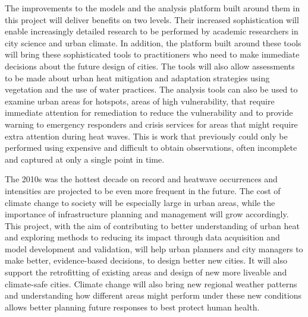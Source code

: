 The improvements to the models and the analysis platform built around them in this project will deliver benefits on two levels. Their increased sophistication will enable increasingly detailed research to be performed by academic researchers in city science and urban climate. In addition, the platform built around these tools will bring these sophisticated tools to practitioners who need to make immediate decisions about the future design of cities. The tools will also allow assessments to be made about urban heat mitigation and adaptation strategies using vegetation and the use of water practices. The analysis tools can also be used to examine urban areas for hotspots, areas of high vulnerability, that require immediate attention for remediation to reduce the vulnerability and to provide warning to emergency responders and crisis services for areas that might require extra attention during heat waves. This is work that previously could only be performed using expensive and difficult to obtain observations, often incomplete and captured at only a single point in time.

The 2010s was the hottest decade on record and heatwave occurrences and intensities are projected to be even more frequent in the future. The cost of climate change to society will be especially large in urban areas, while the importance of infrastructure planning and management will grow accordingly. This project, with the aim of contributing to better understanding of urban heat and exploring methods to reducing its impact through data acquisition and model development and validation, will help urban planners and city managers to make better, evidence-based decisions, to design better new cities. It will also support the retrofitting of existing areas and design of new more liveable and climate-safe cities. Climate change will also bring new regional weather patterns and understanding how different areas might perform under these new conditions allows better planning future responses to best protect human health.





